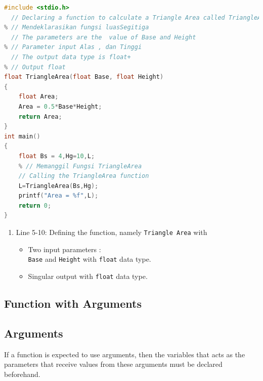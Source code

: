 \begin{lstlisting}[language=c]
	#include <stdio.h>
  // Declaring a function to calculate a Triangle Area called TriangleArea  
% // Mendeklarasikan fungsi luasSegitiga
  // The parameters are the  value of Base and Height
% // Parameter input Alas , dan Tinggi
  // The output data type is float+
% // Output float
float TriangleArea(float Base, float Height)
{
	float Area;
	Area = 0.5*Base*Height;
	return Area;
}
int main()
{
	float Bs = 4,Hg=10,L;
    % // Memanggil Fungsi TriangleArea
	// Calling the TriangleArea function
    L=TriangleArea(Bs,Hg);
	printf("Area = %f",L);
	return 0;
}
\end{lstlisting}
\begin{enumerate}
	\item Line 5-10: Defining the function, namely \verb|Triangle Area| with 
	\begin{itemize}
		\item Two input parameters :\\
	\verb*|Base| and \verb*|Height|  with \verb*|float| data type.
        \item Singular output with \verb*|float| data type.
    \end{itemize}
\end{enumerate}
\subsection{Function with Arguments}

\subsection{Arguments}

If a function is expected to use arguments, 
then the variables that acts as the parameters that receive 
values from these arguments must be declared beforehand. \\

